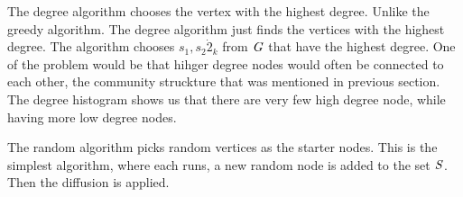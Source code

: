 The degree algorithm chooses the vertex with the highest degree. Unlike the greedy algorithm. The degree algorithm just finds the vertices with the highest degree. The algorithm chooses $s_1, s_2 \dot 2_k$ from $\it{G}$ that have the highest degree. One of the problem would be that hihger degree nodes would often be connected to each other, the community struckture that was mentioned in previous section. The degree histogram shows us that there are very few high degree node, while having more low degree nodes.

The random algorithm picks random vertices as the starter nodes. This is the simplest algorithm, where each runs, a new random node is added to the set $\it{S}$. Then the diffusion is applied. 

